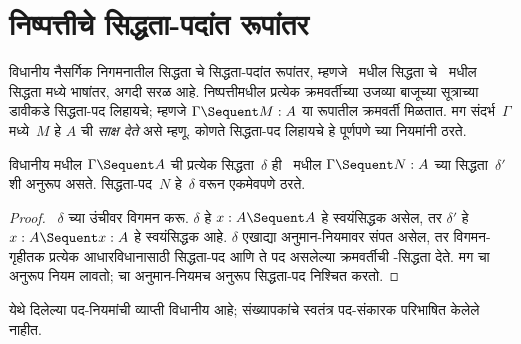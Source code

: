\section{निष्पत्तीचे सिद्धता-पदांत रूपांतर}\label{int:pty:pt:sec}

विधानीय नैसर्गिक निगमनातील सिद्धता चे सिद्धता-पदांत रूपांतर,
म्हणजे~ मधील सिद्धता चे~
मधील सिद्धता मध्ये भाषांतर, अगदी सरळ आहे.
निष्पत्तीमधील प्रत्येक क्रमवर्तीच्या उजव्या
बाजूच्या सूत्राच्या डावीकडे सिद्धता-पद लिहायचे;
म्हणजे $\Gamma \Sequent M : A$ या रूपातील
क्रमवर्ती मिळतात. मग संदर्भ~$\Gamma$ मध्ये~$M$ हे
$A$ ची \emph{साक्ष देते} असे म्हणू. कोणते सिद्धता-पद
लिहायचे हे पूर्णपणे  च्या नियमांनी ठरते.

\begin{prop}
विधानीय  मधील $\Gamma \Sequent A$ ची प्रत्येक
सिद्धता~$\delta$ ही~ मधील
$\Gamma \Sequent N : A$ च्या सिद्धता~$\delta'$ शी
अनुरूप असते. सिद्धता-पद~$N$ हे~$\delta$ वरून
एकमेवपणे ठरते.
\end{prop}

\begin{proof}
~$\delta$ च्या उंचीवर विगमन करू. $\delta$ हे
$x:A \Sequent A$ हे स्वयंसिद्धक असेल, तर
$\delta'$ हे~$x:A \Sequent x:A$ हे स्वयंसिद्धक आहे.
$\delta$ एखाद्या अनुमान-नियमावर संपत असेल, तर
विगमन-गृहीतक प्रत्येक आधारविधानासाठी सिद्धता-पद आणि
ते पद असलेल्या क्रमवर्तीची -सिद्धता देते.
मग  चा अनुरूप नियम लावतो;
 चा अनुमान-नियमच अनुरूप सिद्धता-पद निश्चित करतो.
\end{proof}
येथे दिलेल्या पद-नियमांची व्याप्ती विधानीय आहे;
संख्यापकांचे स्वतंत्र पद-संकारक परिभाषित केलेले नाहीत.

